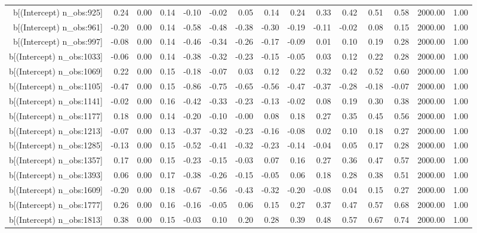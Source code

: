 \begin{table}[ht]
\begin{tabular}{rrrrrrrrrrrrrrr}
  b[(Intercept) n\_obs:925] & 0.24 & 0.00 & 0.14 & -0.10 & -0.02 & 0.05 & 0.14 & 0.24 & 0.33 & 0.42 & 0.51 & 0.58 & 2000.00 & 1.00 \\ 
  b[(Intercept) n\_obs:961] & -0.20 & 0.00 & 0.14 & -0.58 & -0.48 & -0.38 & -0.30 & -0.19 & -0.11 & -0.02 & 0.08 & 0.15 & 2000.00 & 1.00 \\ 
  b[(Intercept) n\_obs:997] & -0.08 & 0.00 & 0.14 & -0.46 & -0.34 & -0.26 & -0.17 & -0.09 & 0.01 & 0.10 & 0.19 & 0.28 & 2000.00 & 1.00 \\ 
  b[(Intercept) n\_obs:1033] & -0.06 & 0.00 & 0.14 & -0.38 & -0.32 & -0.23 & -0.15 & -0.05 & 0.03 & 0.12 & 0.22 & 0.28 & 2000.00 & 1.00 \\ 
  b[(Intercept) n\_obs:1069] & 0.22 & 0.00 & 0.15 & -0.18 & -0.07 & 0.03 & 0.12 & 0.22 & 0.32 & 0.42 & 0.52 & 0.60 & 2000.00 & 1.00 \\ 
  b[(Intercept) n\_obs:1105] & -0.47 & 0.00 & 0.15 & -0.86 & -0.75 & -0.65 & -0.56 & -0.47 & -0.37 & -0.28 & -0.18 & -0.07 & 2000.00 & 1.00 \\ 
  b[(Intercept) n\_obs:1141] & -0.02 & 0.00 & 0.16 & -0.42 & -0.33 & -0.23 & -0.13 & -0.02 & 0.08 & 0.19 & 0.30 & 0.38 & 2000.00 & 1.00 \\ 
  b[(Intercept) n\_obs:1177] & 0.18 & 0.00 & 0.14 & -0.20 & -0.10 & -0.00 & 0.08 & 0.18 & 0.27 & 0.35 & 0.45 & 0.56 & 2000.00 & 1.00 \\ 
  b[(Intercept) n\_obs:1213] & -0.07 & 0.00 & 0.13 & -0.37 & -0.32 & -0.23 & -0.16 & -0.08 & 0.02 & 0.10 & 0.18 & 0.27 & 2000.00 & 1.00 \\ 
  b[(Intercept) n\_obs:1285] & -0.13 & 0.00 & 0.15 & -0.52 & -0.41 & -0.32 & -0.23 & -0.14 & -0.04 & 0.05 & 0.17 & 0.28 & 2000.00 & 1.00 \\ 
  b[(Intercept) n\_obs:1357] & 0.17 & 0.00 & 0.15 & -0.23 & -0.15 & -0.03 & 0.07 & 0.16 & 0.27 & 0.36 & 0.47 & 0.57 & 2000.00 & 1.00 \\ 
  b[(Intercept) n\_obs:1393] & 0.06 & 0.00 & 0.17 & -0.38 & -0.26 & -0.15 & -0.05 & 0.06 & 0.18 & 0.28 & 0.38 & 0.51 & 2000.00 & 1.00 \\ 
  b[(Intercept) n\_obs:1609] & -0.20 & 0.00 & 0.18 & -0.67 & -0.56 & -0.43 & -0.32 & -0.20 & -0.08 & 0.04 & 0.15 & 0.27 & 2000.00 & 1.00 \\ 
  b[(Intercept) n\_obs:1777] & 0.26 & 0.00 & 0.16 & -0.16 & -0.05 & 0.06 & 0.15 & 0.27 & 0.37 & 0.47 & 0.57 & 0.68 & 2000.00 & 1.00 \\ 
  b[(Intercept) n\_obs:1813] & 0.38 & 0.00 & 0.15 & -0.03 & 0.10 & 0.20 & 0.28 & 0.39 & 0.48 & 0.57 & 0.67 & 0.74 & 2000.00 & 1.00 \\ 

\end{tabular}
\end{table}
